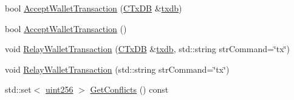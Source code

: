 \begin{DoxyCompactItemize}
\item 
bool \hyperlink{class_c_wallet_tx_af6d1a5a731bb69e1d94de84eb6fd15a5}{Accept\+Wallet\+Transaction} (\hyperlink{class_c_tx_d_b}{C\+Tx\+D\+B} \&\hyperlink{txdb-leveldb_8cpp_a72eff8ae1d84de13daf97a61b8c02bc6}{txdb})
\item 
bool \hyperlink{class_c_wallet_tx_aae2016163fb0bd7f0e1464d381ab8293}{Accept\+Wallet\+Transaction} ()
\item 
void \hyperlink{class_c_wallet_tx_aec8c50f3fcde27525485b6cd4a4e19b5}{Relay\+Wallet\+Transaction} (\hyperlink{class_c_tx_d_b}{C\+Tx\+D\+B} \&\hyperlink{txdb-leveldb_8cpp_a72eff8ae1d84de13daf97a61b8c02bc6}{txdb}, std\+::string str\+Command=\char`\"{}tx\char`\"{})
\item 
void \hyperlink{class_c_wallet_tx_a1eac2a5eea87ed88b73777bea5c733b6}{Relay\+Wallet\+Transaction} (std\+::string str\+Command=\char`\"{}tx\char`\"{})
\item 
std\+::set$<$ \hyperlink{classuint256}{uint256} $>$ \hyperlink{class_c_wallet_tx_ab1820e97b0ed6b80763d61e232d0afaa}{Get\+Conflicts} () const 
\end{DoxyCompactItemize}
